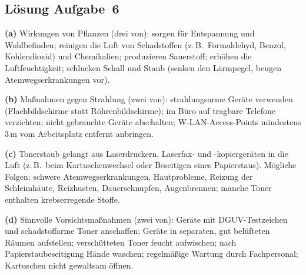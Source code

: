 \documentclass[11pt, a4paper]{article}
\begin{document}
\subsection*{Lösung Aufgabe~6}
\begin{loesung}
\textbf{(a)} Wirkungen von Pflanzen (drei von): sorgen für Entspannung und Wohlbefinden;
reinigen die Luft von Schadstoffen (z.\,B.\ Formaldehyd, Benzol, Kohlendioxid) und
Chemikalien; produzieren Sauerstoff; erhöhen die Luftfeuchtigkeit; schlucken Schall und
Staub (senken den Lärmpegel, beugen Atemwegserkrankungen vor).

\textbf{(b)} Maßnahmen gegen Strahlung (zwei von): strahlungsarme Geräte verwenden
(Flachbildschirme statt Röhrenbildschirme); im Büro auf tragbare Telefone verzichten;
nicht gebrauchte Geräte abschalten; W-LAN-Access-Points mindestens 3\,m vom Arbeitsplatz
entfernt anbringen.

\textbf{(c)} Tonerstaub gelangt aus Laserdruckern, Laserfax- und -kopiergeräten in die
Luft (z.\,B.\ beim Kartuschenwechsel oder Beseitigen eines Papierstaus). Mögliche Folgen:
schwere Atemwegserkrankungen, Hautprobleme, Reizung der Schleimhäute, Reizhusten,
Dauerschnupfen, Augenbrennen; manche Toner enthalten krebserregende Stoffe.

\textbf{(d)} Sinnvolle Vorsichtsmaßnahmen (zwei von): Geräte mit DGUV-Testzeichen und
schadstoffarme Toner anschaffen; Geräte in separaten, gut belüfteten Räumen aufstellen;
verschütteten Toner feucht aufwischen; nach Papierstaubeseitigung Hände waschen;
regelmäßige Wartung durch Fachpersonal; Kartuschen nicht gewaltsam öffnen.
\end{loesung}
\end{document}
